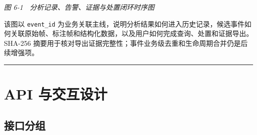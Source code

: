 \emph{图 6-1　分析记录、告警、证据与处置闭环时序图}

该图以 \texttt{event\_\allowbreak{}id} 为业务关联主线，说明分析结果如何进入历史记录，候选事件如何关联原始帧、标注帧和结构化数据，以及用户如何完成查询、处置和证据导出。SHA-256 摘要用于核对导出证据完整性；事件业务级去重和生命周期合并仍是后续增强项。

\begin{center}\rule{0.5\linewidth}{0.5pt}\end{center}

\section{API 与交互设计}\label{design-api-ux4e0eux4ea4ux4e92ux8bbeux8ba1}

\subsection{接口分组}\label{design-ux63a5ux53e3ux5206ux7ec4}

